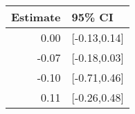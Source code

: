 \begin{tabular}{rl}
  \hline
Estimate & 95\% CI \\ 
  \hline
0.00 & [-0.13,0.14] \\ 
  -0.07 & [-0.18,0.03] \\ 
  -0.10 & [-0.71,0.46] \\ 
  0.11 & [-0.26,0.48] \\ 
   \hline
\end{tabular}

